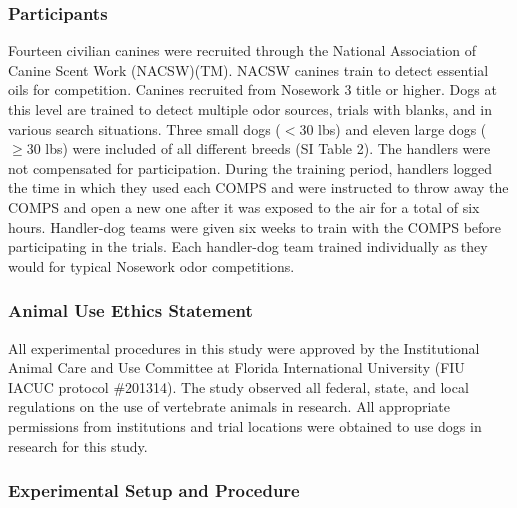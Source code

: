 \documentclass[
]{article}
\begin{document}
\hypertarget{participants}{%
\subsubsection{Participants}\label{participants}}

Fourteen civilian canines were recruited through the National Association of Canine Scent Work (NACSW)(TM). NACSW canines train to detect essential oils for competition. Canines recruited from Nosework 3 title or higher. Dogs at this level are trained to detect multiple odor sources, trials with blanks, and in various search situations. Three small dogs (\(< 30\) lbs) and eleven large dogs (\(\geq 30\) lbs) were included of all different breeds (SI Table 2). The handlers were not compensated for participation. During the training period, handlers logged the time in which they used each COMPS and were instructed to throw away the COMPS and open a new one after it was exposed to the air for a total of six hours. Handler-dog teams were given six weeks to train with the COMPS before participating in the trials. Each handler-dog team trained individually as they would for typical Nosework odor competitions.

\hypertarget{animal-use-ethics-statement}{%
\subsubsection{Animal Use Ethics Statement}\label{animal-use-ethics-statement}}

All experimental procedures in this study were approved by the Institutional Animal Care and Use Committee at Florida International University (FIU IACUC protocol \#201314). The study observed all federal, state, and local regulations on the use of vertebrate animals in research. All appropriate permissions from institutions and trial locations were obtained to use dogs in research for this study.

\hypertarget{experimental-setup-and-procedure}{%
\subsubsection{Experimental Setup and Procedure}\label{experimental-setup-and-procedure}}
\end{document}
